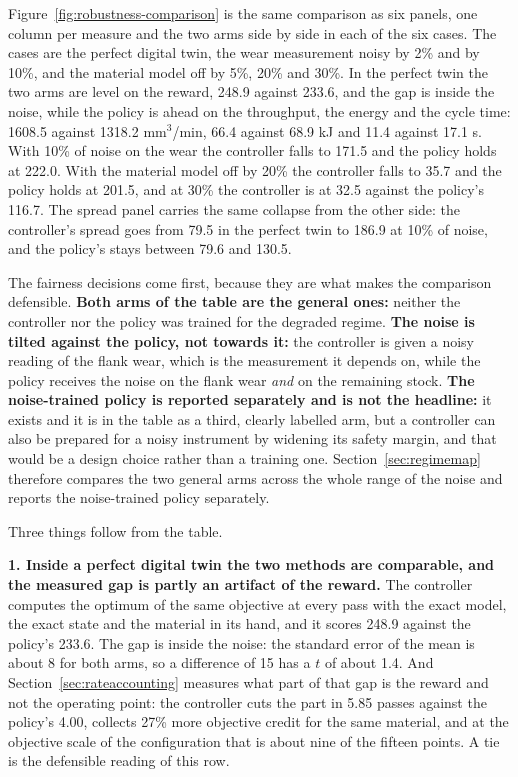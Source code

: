 \documentclass[11pt,a4paper]{article}
\begin{document}
Figure~\ref{fig:robustness-comparison} is the same comparison as six panels, one column per measure and the two arms side by side in each of the six cases. The cases are the perfect digital twin, the wear measurement noisy by 2\% and by 10\%, and the material model off by 5\%, 20\% and 30\%. In the perfect twin the two arms are level on the reward, 248.9 against 233.6, and the gap is inside the noise, while the policy is ahead on the throughput, the energy and the cycle time: 1608.5 against 1318.2 mm$^3$/min, 66.4 against 68.9 kJ and 11.4 against 17.1 s. With 10\% of noise on the wear the controller falls to 171.5 and the policy holds at 222.0. With the material model off by 20\% the controller falls to 35.7 and the policy holds at 201.5, and at 30\% the controller is at 32.5 against the policy's 116.7. The spread panel carries the same collapse from the other side: the controller's spread goes from 79.5 in the perfect twin to 186.9 at 10\% of noise, and the policy's stays between 79.6 and 130.5.

The fairness decisions come first, because they are what makes the comparison defensible. \textbf{Both arms of the table are the general ones:} neither the controller nor the policy was trained for the degraded regime. \textbf{The noise is tilted against the policy, not towards it:} the controller is given a noisy reading of the flank wear, which is the measurement it depends on, while the policy receives the noise on the flank wear \emph{and} on the remaining stock. \textbf{The noise-trained policy is reported separately and is not the headline:} it exists and it is in the table as a third, clearly labelled arm, but a controller can also be prepared for a noisy instrument by widening its safety margin, and that would be a design choice rather than a training one. Section~\ref{sec:regimemap} therefore compares the two general arms across the whole range of the noise and reports the noise-trained policy separately.

Three things follow from the table.

\textbf{1. Inside a perfect digital twin the two methods are comparable, and the measured gap is partly an artifact of the reward.} The controller computes the optimum of the same objective at every pass with the exact model, the exact state and the material in its hand, and it scores 248.9 against the policy's 233.6. The gap is inside the noise: the standard error of the mean is about 8 for both arms, so a difference of 15 has a $t$ of about 1.4. And Section~\ref{sec:rateaccounting} measures what part of that gap is the reward and not the operating point: the controller cuts the part in 5.85 passes against the policy's 4.00, collects 27\% more objective credit for the same material, and at the objective scale of the configuration that is about nine of the fifteen points. A tie is the defensible reading of this row.
\end{document}

